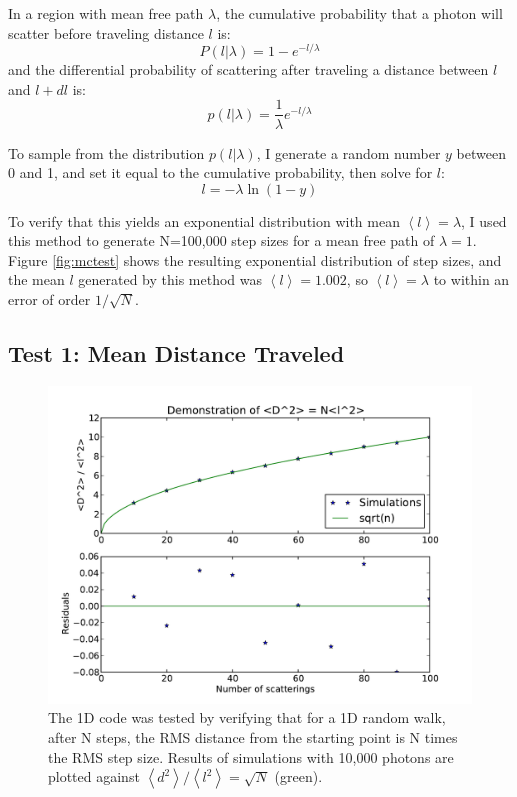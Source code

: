 \documentclass{amsart}
\begin{document}
In a region with mean free path $\lambda$, the cumulative probability
that a photon will scatter before traveling distance $l$ is:
\begin{equation}
	P(l|\lambda) = 1 - e^{-l/\lambda}
\end{equation}
and the differential probability of scattering after traveling
a distance between $l$ and $l+dl$
is:
\begin{equation}
	p(l|\lambda) = \frac{1}{\lambda}e^{-l/\lambda}
\end{equation}

To sample from the distribution $p(l|\lambda)$, I generate a random
number $y$ between 0 and 1, and set it equal to the cumulative
probability, then solve for $l$:
\begin{equation}
	l = -\lambda \ln (1-y)
\end{equation}

To verify that this yields an exponential distribution with mean $\left<l\right>=\lambda$, I used this method to generate N=100,000 step sizes for a
mean free path of $\lambda=1$.  Figure \ref{fig:mctest} shows the
resulting exponential distribution of step sizes, and the mean $l$
generated by this method was $\left<l\right>=1.002$, so $\left<l\right>=\lambda$ to within an error of order $1/\sqrt{N}$.

\subsection{Test 1: Mean Distance Traveled}

\begin{figure}[h]
  \begin{center}
     \includegraphics[width=\textwidth]{simpletest}
  \end{center}
  \caption{The 1D code was tested by verifying that for a 1D random walk, after N steps, the RMS distance from the starting point is N times the RMS step size.  Results of simulations with 10,000 photons are plotted against ${\left<d^2\right>/\left<l^2\right>=\sqrt{N}}$ (green).}
\label{fig:simpletest}
\end{figure}
\end{document}
